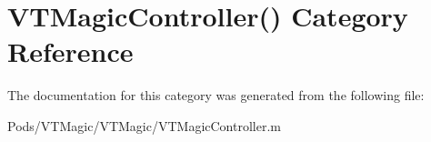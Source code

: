 \hypertarget{category_v_t_magic_controller_07_08}{}\section{V\+T\+Magic\+Controller() Category Reference}
\label{category_v_t_magic_controller_07_08}


The documentation for this category was generated from the following file\+:\begin{DoxyCompactItemize}
\item 
Pods/\+V\+T\+Magic/\+V\+T\+Magic/V\+T\+Magic\+Controller.\+m\end{DoxyCompactItemize}
